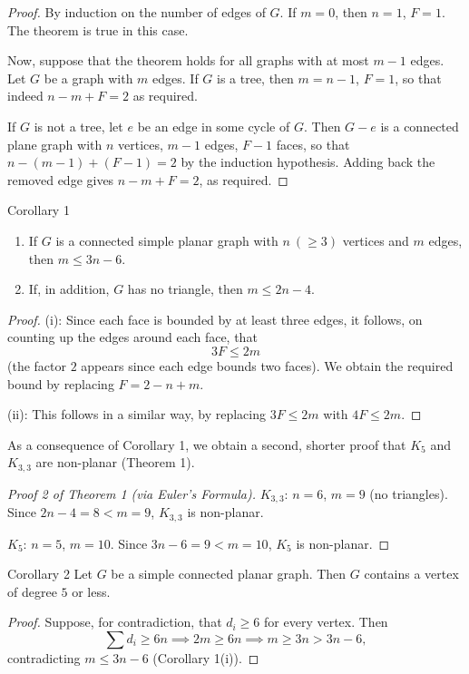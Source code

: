 \documentclass[11pt]{scrartcl}
\theoremstyle{plain}
\theoremstyle{remark}
\begin{document}
\begin{proof}
By induction on the number of edges of $G$. If $m = 0$, then $n = 1$, $F = 1$. The theorem is true in this case.

Now, suppose that the theorem holds for all graphs with at most $m-1$ edges. Let $G$ be a graph with $m$ edges. If $G$ is a tree, then $m = n-1$, $F = 1$, so that indeed $n - m + F = 2$ as required.

If $G$ is not a tree, let $e$ be an edge in some cycle of $G$. Then $G - e$ is a connected plane graph with $n$ vertices, $m-1$ edges, $F-1$ faces, so that $n - (m-1) + (F-1) = 2$ by the induction hypothesis. Adding back the removed edge gives $n - m + F = 2$, as required.
\end{proof}

\begin{thmbox}{Corollary 1}
\begin{enumerate}
  \item[(i)] If $G$ is a connected simple planar graph with $n\ (\geq 3)$ vertices and $m$ edges, then $m \leq 3n - 6$.
  \item[(ii)] If, in addition, $G$ has no triangle, then $m \leq 2n - 4$.
\end{enumerate}
\end{thmbox}

\begin{proof}
(i): Since each face is bounded by at least three edges, it follows, on counting up the edges around each face, that
$$3F \leq 2m$$
(the factor $2$ appears since each edge bounds two faces). We obtain the required bound by replacing $F = 2 - n + m$.

\medskip
\noindent (ii): This follows in a similar way, by replacing $3F \leq 2m$ with $4F \leq 2m$.
\end{proof}

\medskip
\noindent As a consequence of Corollary 1, we obtain a second, shorter proof that $K_5$ and $K_{3,3}$ are non-planar (Theorem 1).

\begin{proof}[Proof 2 of Theorem 1 (via Euler's Formula)]
$K_{3,3}$: $n=6$, $m=9$ (no triangles). Since $2n-4 = 8 < m = 9$, $K_{3,3}$ is non-planar.

\medskip
\noindent $K_5$: $n=5$, $m=10$. Since $3n-6 = 9 < m = 10$, $K_5$ is non-planar.
\end{proof}

\begin{thmbox}{Corollary 2}
Let $G$ be a simple connected planar graph. Then $G$ contains a vertex of degree $5$ or less.
\end{thmbox}

\begin{proof}
Suppose, for contradiction, that $d_i \geq 6$ for every vertex. Then
$$\sum d_i \geq 6n \implies 2m \geq 6n \implies m \geq 3n > 3n - 6,$$
contradicting $m \leq 3n-6$ (Corollary 1(i)).
\end{proof}
\end{document}
